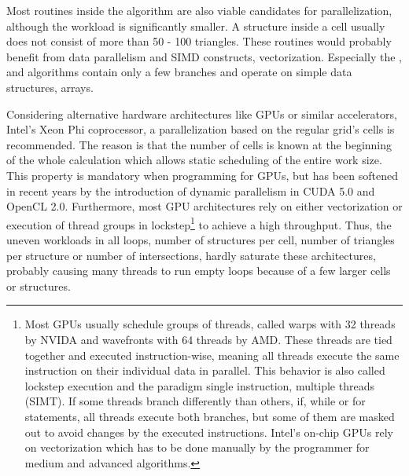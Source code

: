 Most routines inside the  algorithm are also viable candidates for parallelization, although the workload is significantly smaller.
A structure inside a cell usually does not consist of more than 50 - 100 triangles.
These routines would probably benefit from data parallelism and SIMD constructs, \ie vectorization.
Especially the ,  and  algorithms contain only a few branches and operate on simple data structures, \ie arrays.

Considering alternative hardware architectures like GPUs or similar accelerators, \eg Intel's Xeon Phi coprocessor, a parallelization based on the regular grid's cells is recommended.
The reason is that the number of cells is known at the beginning of the whole calculation which allows static scheduling of the entire work size.
This property is mandatory when programming for GPUs, but has been softened in recent years by the introduction of dynamic parallelism in CUDA 5.0 and OpenCL 2.0.
Furthermore, most GPU architectures rely on either vectorization or execution of thread groups in lockstep\footnote{
	Most GPUs usually schedule groups of threads, called warps with 32 threads by NVIDA and wavefronts with 64 threads by AMD.
	These threads are tied together and executed instruction-wise, meaning all threads execute the same instruction on their individual data in parallel.
	This behavior is also called lockstep execution and the paradigm single instruction, multiple threads (SIMT).
	If some threads branch differently than others, \eg if, while or for statements, all threads execute both branches, but some of them are masked out to avoid changes by the executed instructions.
	Intel's on-chip GPUs rely on vectorization which has to be done manually by the programmer for medium and advanced algorithms.} to achieve a high throughput.
Thus, the uneven workloads in all loops, \eg number of structures per cell, number of triangles per structure or number of intersections, hardly saturate these architectures, probably causing many threads to run empty loops because of a few larger cells or structures.
